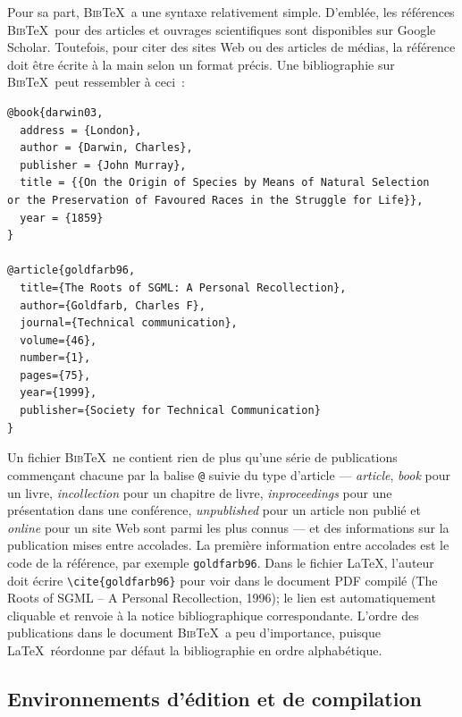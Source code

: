 \documentclass[
  letterpaper,
  DIV=11,
  numbers=noendperiod]{scrreprt}
\begin{document}
Pour sa part, \textsc{Bib}\TeX~a une syntaxe relativement simple.
D'emblée, les références \textsc{Bib}\TeX~pour des articles et ouvrages
scientifiques sont disponibles sur Google Scholar. Toutefois, pour citer
des sites Web ou des articles de médias, la référence doit être écrite à
la main selon un format précis. Une bibliographie sur
\textsc{Bib}\TeX~peut ressembler à ceci~:

\begin{verbatim}
@book{darwin03,
  address = {London},
  author = {Darwin, Charles},
  publisher = {John Murray},
  title = {{On the Origin of Species by Means of Natural Selection
or the Preservation of Favoured Races in the Struggle for Life}},
  year = {1859}
}

@article{goldfarb96,
  title={The Roots of SGML: A Personal Recollection},
  author={Goldfarb, Charles F},
  journal={Technical communication},
  volume={46},
  number={1},
  pages={75},
  year={1999},
  publisher={Society for Technical Communication}
}
\end{verbatim}

Un fichier \textsc{Bib}\TeX~ne contient rien de plus qu'une série de
publications commençant chacune par la balise \texttt{@} suivie du type
d'article --- \emph{article}, \emph{book} pour un livre,
\emph{incollection} pour un chapitre de livre, \emph{inproceedings} pour
une présentation dans une conférence, \emph{unpublished} pour un article
non publié et \emph{online} pour un site Web sont parmi les plus connus
--- et des informations sur la publication mises entre accolades. La
première information entre accolades est le code de la référence, par
exemple \texttt{goldfarb96}. Dans le fichier \LaTeX, l'auteur doit
écrire \texttt{\textbackslash{}cite\{goldfarb96\}} pour voir dans le
document PDF compilé (The {Roots} of {SGML} -- {A Personal
Recollection}, 1996); le lien est automatiquement cliquable et renvoie à
la notice bibliographique correspondante. L'ordre des publications dans
le document \textsc{Bib}\TeX~a peu d'importance, puisque
\LaTeX~réordonne par défaut la bibliographie en ordre alphabétique.

\subsection{Environnements d'édition et de
compilation}\label{environnements-duxe9dition-et-de-compilation}
\end{document}

